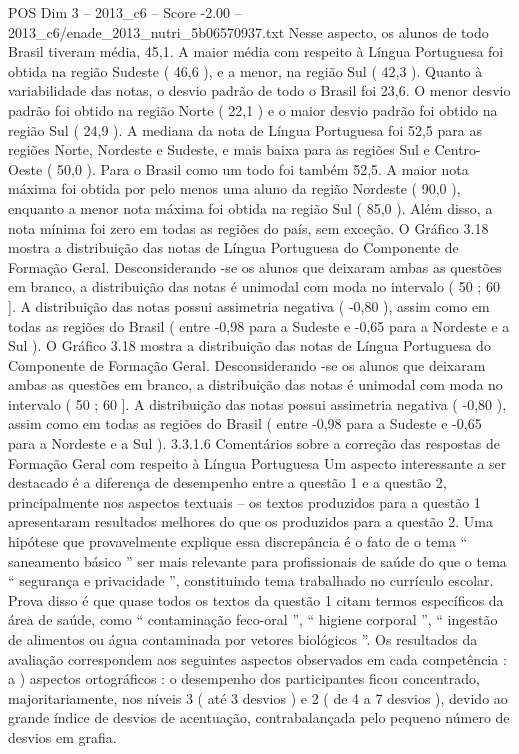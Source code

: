 \begin{textsample}{POS Dim 3 – 2013\_c6 – Score -2.00 – 2013\_c6/enade\_2013\_nutri\_5b06570937.txt}
Nesse aspecto, os alunos de todo Brasil tiveram média, 45,1.
A maior média com respeito à Língua Portuguesa foi obtida na região Sudeste ( 46,6 ), e a menor, na região Sul ( 42,3 ).
Quanto à variabilidade das notas, o desvio padrão de todo o Brasil foi 23,6.
O menor desvio padrão foi obtido na região Norte ( 22,1 ) e o maior desvio padrão foi obtido na região Sul ( 24,9 ).
A mediana da nota de Língua Portuguesa foi 52,5 para as regiões Norte, Nordeste e Sudeste, e mais baixa para as regiões Sul e Centro-Oeste ( 50,0 ).
Para o Brasil como um todo foi também 52,5.
A maior nota máxima foi obtida por pelo menos uma aluno da região Nordeste ( 90,0 ), enquanto a menor nota máxima foi obtida na região Sul ( 85,0 ).
Além disso, a nota mínima foi zero em todas as regiões do país, sem exceção.
O Gráfico 3.18 mostra a distribuição das notas de Língua Portuguesa do Componente de Formação Geral.
Desconsiderando -se os alunos que deixaram ambas as questões em branco, a distribuição das notas é unimodal com moda no intervalo ( 50 ; 60 ].
A distribuição das notas possui assimetria negativa ( -0,80 ), assim como em todas as regiões do Brasil ( entre -0,98 para a Sudeste e -0,65 para a Nordeste e a Sul ).
O Gráfico 3.18 mostra a distribuição das notas de Língua Portuguesa do Componente de Formação Geral.
Desconsiderando -se os alunos que deixaram ambas as questões em branco, a distribuição das notas é unimodal com moda no intervalo ( 50 ; 60 ].
A distribuição das notas possui assimetria negativa ( -0,80 ), assim como em todas as regiões do Brasil ( entre -0,98 para a Sudeste e -0,65 para a Nordeste e a Sul ). 3.3.1.6 Comentários sobre a correção das respostas de Formação Geral com respeito à Língua Portuguesa Um aspecto interessante a ser destacado é a diferença de desempenho entre a questão 1 e a questão 2, principalmente nos aspectos textuais – os textos produzidos para a questão 1 apresentaram resultados melhores do que os produzidos para a questão 2.
Uma hipótese que provavelmente explique essa discrepância é o fato de o tema “ saneamento básico ” ser mais relevante para profissionais de saúde do que o tema “ segurança e privacidade ”, constituindo tema trabalhado no currículo escolar.
Prova disso é que quase todos os textos da questão 1 citam termos específicos da área de saúde, como “ contaminação feco-oral ”, “ higiene corporal ”, “ ingestão de alimentos ou água contaminada por vetores biológicos ”.
Os resultados da avaliação correspondem aos seguintes aspectos observados em cada competência : a ) aspectos ortográficos : o desempenho dos participantes ficou concentrado, majoritariamente, nos níveis 3 ( até 3 desvios ) e 2 ( de 4 a 7 desvios ), devido ao grande índice de desvios de acentuação, contrabalançada pelo pequeno número de desvios em grafia.

\end{textsample}
